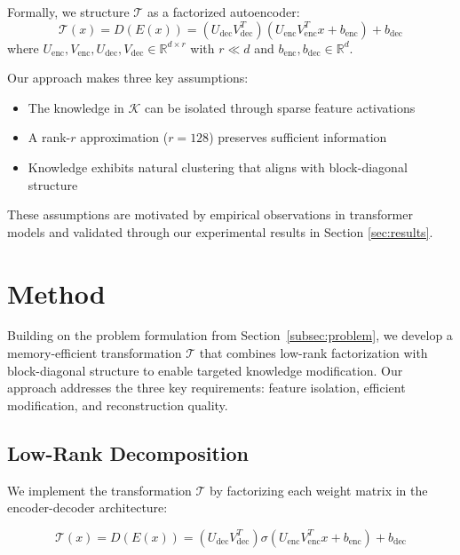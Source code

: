 \documentclass{article} %
\begin{document}
Formally, we structure $\mathcal{T}$ as a factorized autoencoder:
\begin{equation}
    \mathcal{T}(x) = D(E(x)) = (U_{\text{dec}}V_{\text{dec}}^T)(U_{\text{enc}}V_{\text{enc}}^T x + b_{\text{enc}}) + b_{\text{dec}}
\end{equation}
where $U_{\text{enc}}, V_{\text{enc}}, U_{\text{dec}}, V_{\text{dec}} \in \mathbb{R}^{d \times r}$ with $r \ll d$ and $b_{\text{enc}}, b_{\text{dec}} \in \mathbb{R}^d$.

Our approach makes three key assumptions:
\begin{itemize}
    \item The knowledge in $\mathcal{K}$ can be isolated through sparse feature activations
    \item A rank-$r$ approximation ($r=128$) preserves sufficient information
    \item Knowledge exhibits natural clustering that aligns with block-diagonal structure
\end{itemize}

These assumptions are motivated by empirical observations in transformer models \cite{vaswani2017attention} and validated through our experimental results in Section \ref{sec:results}.

\section{Method}
\label{sec:method}

Building on the problem formulation from Section~\ref{subsec:problem}, we develop a memory-efficient transformation $\mathcal{T}$ that combines low-rank factorization with block-diagonal structure to enable targeted knowledge modification. Our approach addresses the three key requirements: feature isolation, efficient modification, and reconstruction quality.

\subsection{Low-Rank Decomposition}
We implement the transformation $\mathcal{T}$ by factorizing each weight matrix in the encoder-decoder architecture:

\begin{equation}
    \mathcal{T}(x) = D(E(x)) = (U_{\text{dec}}V_{\text{dec}}^T)\sigma(U_{\text{enc}}V_{\text{enc}}^T x + b_{\text{enc}}) + b_{\text{dec}}
\end{equation}
\end{document}
